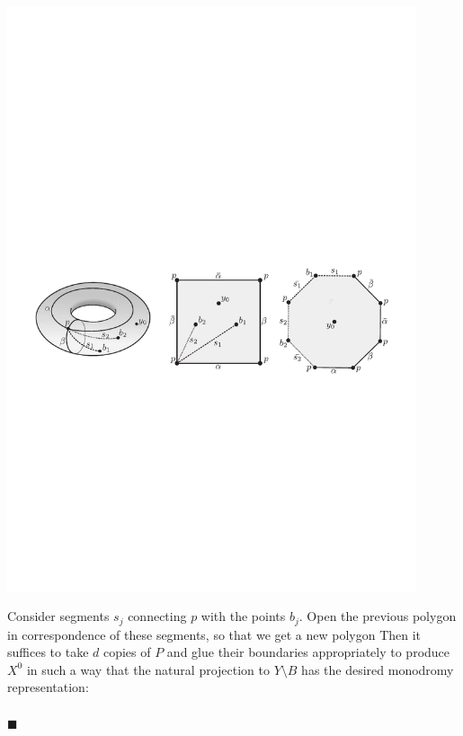 \documentclass[10pt]{beamer}
\begin{document}
\begin{frame}
	\vspace{-10pt}
	\includegraphics[width=0.9\textwidth]{../figures/CM-fig-7-6.pdf}
	
	Consider segments $s_j$ connecting $p$ with the points $b_j$. Open the previous polygon in correspondence of these segments, so that we get a new polygon
	Then it suffices to take $d$ copies of $P$ and glue their boundaries appropriately to produce $X^0$ in such a way that the natural projection to $Y\setminus B$ has the desired monodromy representation:\\[-10pt]
	\\[-10pt]
	
	\hfill$\blacksquare$
\end{frame}
\end{document}
